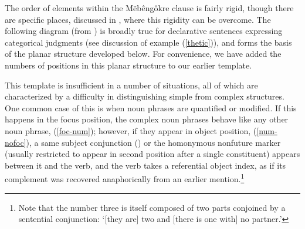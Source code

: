 \documentclass[output=paper]{langscibook}
\begin{document}
The order of elements within the Mẽbêngôkre clause is fairly rigid, though there are specific places, discussed in , where this rigidity can be overcome. The following diagram (from \citealt{salanova:phd}) is broadly true for declarative sentences expressing categorical judgments (see discussion of example (\ref{thetic})), and forms the basis of the planar structure developed below. For convenience, we have added the numbers of positions in this planar structure to our earlier template.

\ea\label{sov}
\z

\label{breaks}This template is insufficient in a number of situations, all of which are characterized by a difficulty in distinguishing simple from complex structures. One common case of this is when noun phrases are quantified or modified. If this happens in the focus position, the complex noun phrases behave like any other noun phrase, (\ref{foc-num}); however, if they appear in object position, (\ref{num-nofoc}), a same subject conjunction () or the homonymous nonfuture marker (usually restricted to appear in second position after a single constituent) appears between it and the verb, and the verb takes a referential object index, as if its complement was recovered anaphorically from an earlier mention.\footnote{Note that the number three is itself composed of two parts conjoined by a sentential conjunction: `[they are] two and [there is one with] no partner.'}
\end{document}

